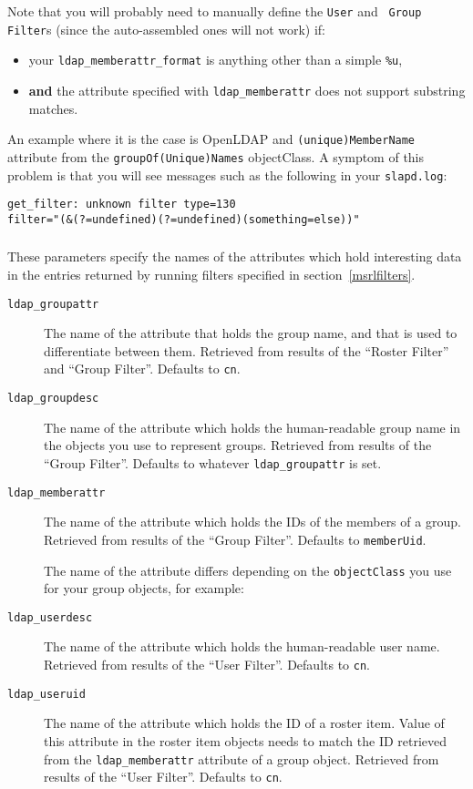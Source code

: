 \documentclass[a4paper,10pt]{book}
\newcommand{\makesubsubsection}[2]{ \aname{#1}{} \subsubsection{\ahrefloc{#1}{#2}} \label{#1} }
\newcommand{\bracehack}{\def\{{\char"7B}\def\}{\char"7D}}
\newcommand{\titem}[1]{\item[\bracehack\texttt{#1}]}
\begin{document}
Note that you will probably need to manually define the {\tt User} and {\tt
Group Filter}s (since the auto-assembled ones will not work) if:
\begin{itemize}
\item your {\tt ldap\_memberattr\_format} is anything other than a simple {\tt \%u},
\item {\bf and} the attribute specified with {\tt ldap\_memberattr} does not support substring matches.
\end{itemize}
An example where it is the case is OpenLDAP and {\tt (unique)MemberName} attribute from the {\tt groupOf(Unique)Names} objectClass.
A symptom of this problem is that you will see messages such as the following in your {\tt slapd.log}:
\begin{verbatim}
get_filter: unknown filter type=130
filter="(&(?=undefined)(?=undefined)(something=else))"
\end{verbatim}

\makesubsubsection{msrlattrs}{Attributes}

These parameters specify the names of the attributes which hold interesting data
in the entries returned by running filters specified in
section~\ref{msrlfilters}.

\begin{description}
 \titem{{\tt ldap\_groupattr}}
 The name of the attribute that holds the group name, and that is used to differentiate between them.
 Retrieved from results of the ``Roster Filter'' and ``Group Filter''.
 Defaults to {\tt cn}.

 \titem{{\tt ldap\_groupdesc}}
 The name of the attribute which holds the human-readable group name in the
 objects you use to represent groups.
 Retrieved from results of the ``Group Filter''.
 Defaults to whatever {\tt ldap\_groupattr} is set.

 \titem{{\tt ldap\_memberattr}}
 The name of the attribute which holds the IDs of the members of a group.
 Retrieved from results of the ``Group Filter''.
 Defaults to {\tt memberUid}.

 The name of the attribute differs depending on the {\tt objectClass} you use
 for your group objects, for example:

 \titem{{\tt ldap\_userdesc}}
 The name of the attribute which holds the human-readable user name.
 Retrieved from results of the ``User Filter''.
 Defaults to {\tt cn}.

 \titem{{\tt ldap\_useruid}}
 The name of the attribute which holds the ID of a roster item. Value of this
 attribute in the roster item objects needs to match the ID retrieved from the
 {\tt ldap\_memberattr} attribute of a group object.
 Retrieved from results of the ``User Filter''.
 Defaults to {\tt cn}.
\end{description}
\end{document}
